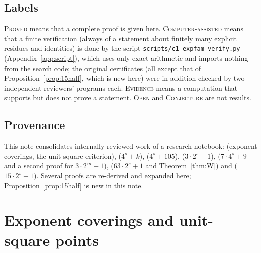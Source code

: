 \documentclass[11pt,reqno]{amsart}
\theoremstyle{definition}
\newcommand{\status}[1]{\textup{\textsc{#1}}}
\begin{document}
\subsection*{Labels}
\status{Proved} means that a complete proof is given here.
\status{Computer-assisted} means that a finite verification (always of a
statement about finitely many explicit residues and identities) is done by
the script \texttt{scripts/c1\_expfam\_verify.py}
(Appendix~\ref{app:script}), which uses only exact arithmetic and imports
nothing from the search code; the original certificates (all except that
of Proposition~\ref{prop:15half}, which is new here) were in addition checked
by two independent reviewers' programs each.  \status{Evidence}
means a computation that supports but does not prove a statement.
\status{Open} and \status{Conjecture} are not results.

\subsection*{Provenance}
This note consolidates internally reviewed work of a research notebook:
\cite{ExpCov} (exponent coverings, the unit-square criterion),
\cite{SignFields} ($4^s+k$), \cite{Sparks6} ($4^s+105$),
\cite{MenuSterility} ($3\cdot2^s+1$), \cite{Exp105} ($7\cdot4^s+9$ and a
second proof for $3\cdot2^m+1$), \cite{ExpOpen} ($63\cdot2^s+1$ and
Theorem~\ref{thm:W}) and \cite{Exp15} ($15\cdot2^s+1$).  Several proofs are
re-derived and expanded here; Proposition~\ref{prop:15half} is new in this
note.

\section{Exponent coverings and unit-square points}\label{sec:criterion}
\end{document}
